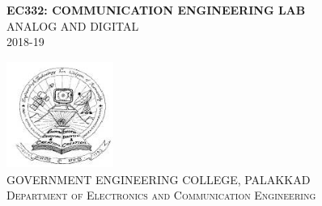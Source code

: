  
\begin{titlepage}
	\begin{center}
		\Large{{\textbf{EC332: COMMUNICATION ENGINEERING LAB}}}\\[0.5cm]
		
		\Large{ANALOG AND DIGITAL}\\[1cm]
		
		\large{2018-19}\\[5cm]
		
		\raggedbottom
		
		\includegraphics[height=3.5cm,width=3.5cm]{geclogo.jpg}\\[3cm]
		\textsc{\Large {GOVERNMENT ENGINEERING COLLEGE, PALAKKAD}}~\\[.5cm]
		{\textsc{\Large {Department of Electronics and Communication Engineering}}}\\
	\end{center}
\end{titlepage}
